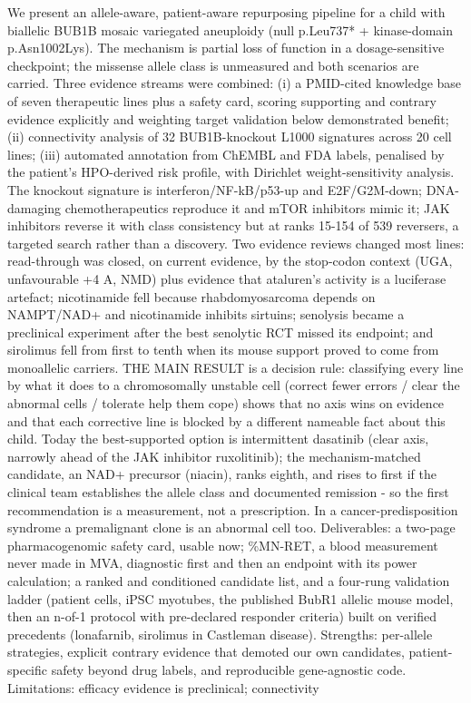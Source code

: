 \begin{description}[leftmargin=0pt,style=nextline,itemsep=4pt,font=\sffamily\bfseries\small\color{branddark}]
\item[Provide a method abstract (up to 500 words). Please include strengths and limitations of your approach as well as methodological detail.] We present an allele-aware, patient-aware repurposing pipeline for a child with biallelic BUB1B mosaic variegated aneuploidy (null p.Leu737* + kinase-domain p.Asn1002Lys). The mechanism is partial loss of function in a dosage-sensitive checkpoint; the missense allele class is unmeasured and both scenarios are carried. Three evidence streams were combined: (i) a PMID-cited knowledge base of seven therapeutic lines plus a safety card, scoring supporting and contrary evidence explicitly and weighting target validation below demonstrated benefit; (ii) connectivity analysis of 32 BUB1B-knockout L1000 signatures across 20 cell lines; (iii) automated annotation from ChEMBL and FDA labels, penalised by the patient's HPO-derived risk profile, with Dirichlet weight-sensitivity analysis. The knockout signature is interferon/NF-kB/p53-up and E2F/G2M-down; DNA-damaging chemotherapeutics reproduce it and mTOR inhibitors mimic it; JAK inhibitors reverse it with class consistency but at ranks 15-154 of 539 reversers, a targeted search rather than a discovery. Two evidence reviews changed most lines: read-through was closed, on current evidence, by the stop-codon context (UGA, unfavourable +4 A, NMD) plus evidence that ataluren's activity is a luciferase artefact; nicotinamide fell because rhabdomyosarcoma depends on NAMPT/NAD+ and nicotinamide inhibits sirtuins; senolysis became a preclinical experiment after the best senolytic RCT missed its endpoint; and sirolimus fell from first to tenth when its mouse support proved to come from monoallelic carriers. THE MAIN RESULT is a decision rule: classifying every line by what it does to a chromosomally unstable cell (correct fewer errors / clear the abnormal cells / tolerate help them cope) shows that no axis wins on evidence and that each corrective line is blocked by a different nameable fact about this child. Today the best-supported option is intermittent dasatinib (clear axis, narrowly ahead of the JAK inhibitor ruxolitinib); the mechanism-matched candidate, an NAD+ precursor (niacin), ranks eighth, and rises to first if the clinical team establishes the allele class and documented remission - so the first recommendation is a measurement, not a prescription. In a cancer-predisposition syndrome a premalignant clone is an abnormal cell too. Deliverables: a two-page pharmacogenomic safety card, usable now; \%MN-RET, a blood measurement never made in MVA, diagnostic first and then an endpoint with its power calculation; a ranked and conditioned candidate list, and a four-rung validation ladder (patient cells, iPSC myotubes, the published BubR1 allelic mouse model, then an n-of-1 protocol with pre-declared responder criteria) built on verified precedents (lonafarnib, sirolimus in Castleman disease). Strengths: per-allele strategies, explicit contrary evidence that demoted our own candidates, patient-specific safety beyond drug labels, and reproducible gene-agnostic code. Limitations: efficacy evidence is preclinical; connectivity 
\end{description}
